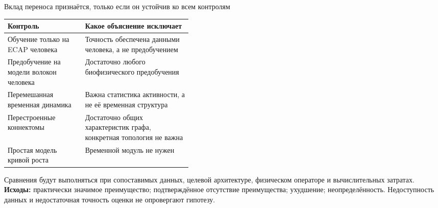 \begin{frame}{Вклад переноса признаётся, только если он устойчив ко всем контролям}
\begin{tabularx}{\linewidth}{|L{0.42\linewidth}|Y|}
\hline Контроль & Какое объяснение исключает \\\hline
Обучение только на ECAP человека & Точность обеспечена данными человека, а не предобучением \\\hline
Предобучение на модели волокон человека & Достаточно любого биофизического предобучения \\\hline
Перемешанная временная динамика & Важна статистика активности, а не её временная структура \\\hline
Перестроенные коннектомы & Достаточно общих характеристик графа, конкретная топология не важна \\\hline
Простая модель кривой роста & Временной модуль не нужен \\\hline
\end{tabularx}
\SlideGap
Сравнения будут выполняться при сопоставимых данных, целевой архитектуре, физическом операторе и вычислительных затратах.
\SlideGap
\textbf{Исходы:} практически значимое преимущество; подтверждённое отсутствие преимущества; ухудшение; неопределённость. Недоступность данных и недостаточная точность оценки не опровергают гипотезу.
\end{frame}
